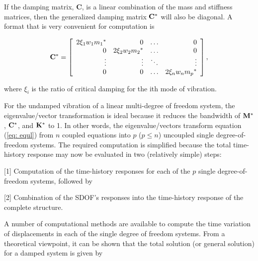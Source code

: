 \vspace{0.15 in}\noindent
If the damping matrix, {\bf C}, is a linear combination of
the mass and stiffness matrices, then
the generalized damping matrix ${\bf C^*}$ will also be diagonal.
A format that is very convenient for computation is

\begin{equation}
{\bf C^*} = \left[
\begin{array}{rrrr}
2 \xi_1 w_1 {m_1}^* &                   0 &   \ldots    &     0      \\
                  0 &  2 \xi_2 w_2 {m_2}^*&   \ldots    &     0      \\
             \vdots &               \vdots&   \ddots    & \vdots     \\
                   0&                    0&   \ldots    &2 \xi_n w_n {m_p}^* \\
\end{array}
\right],
\label{eq:uncoupled-3}
\end{equation}

\vspace{0.15 in}\noindent
where $\xi_i$ is the ratio of critical damping for the ith mode of vibration.

\vspace{0.15 in}
\noindent\hspace{0.5 in}
For the undamped vibration of a linear multi-degree of freedom system,
the eigenvalue/vector transformation is ideal because it
reduces the bandwidth of ${\bf M^*}$, ${\bf C^*}$, and ${\bf K^*}$ to 1.
In other words, the eigenvalue/vectors transform
equation (\ref{eq: equl}) from $n$ coupled equations
into $p$ ($p \le n$) uncoupled single degree-of-freedom systems.
The required computation is simplified because the total time-history
response may now be evaluated in two (relatively simple) steps:

\begin{description}
\item{[1]}
Computation of the time-history responses for each
of the $p$ single degree-of-freedom systems, followed by
\vspace{0.05 in}
\item{[2]}
Combination of the SDOF's responses into
the time-history response of the complete structure.
\end{description}

\vspace{0.15 in}\noindent
A number of computational methods are available to compute
the time variation of displacements in each
of the single degree of freedom systems. From a theoretical
viewpoint, it can be shown that the total
solution (or general solution) for a damped system is given by

